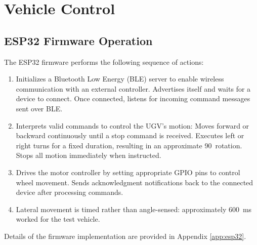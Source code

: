 \documentclass[conference]{IEEEtran}
\begin{document}
	\section{Vehicle Control}
	\subsection{ESP32 Firmware Operation}

The ESP32 firmware performs the following sequence of actions:

\begin{enumerate}
    \item Initializes a Bluetooth Low Energy (BLE) server to enable wireless communication with an external controller. Advertises itself and waits for a device to connect. Once connected, listens for incoming command messages sent over BLE.

    \item Interprets valid commands to control the UGV's motion:
		Moves forward or backward continuously until a stop command is received. Executes left or right turns for a fixed duration, resulting in an approximate 90\degree \ rotation. Stops all motion immediately when instructed.
    
    \item Drives the motor controller by setting appropriate GPIO pins to control wheel movement. Sends acknowledgment notifications back to the connected device after processing commands.
	\item Lateral movement is timed rather than angle-sensed: approximately 600\, ms worked for the test vehicle.
\end{enumerate}

Details of the firmware implementation are provided in Appendix
\ref{app:esp32}.
	
	
	
\end{document}
